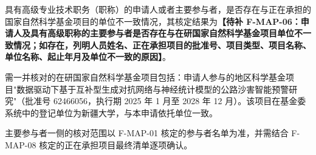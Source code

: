 \justifying
\NSFCBodyText

具有高级专业技术职务（职称）的申请人或者主要参与者，是否存在与正在承担的国家自然科学基金项目的单位不一致情况，其核定结果为\textbf{【待补 F-MAP-06：申请人及具有高级职称的主要参与者是否存在与在研国家自然科学基金项目单位不一致情况；如存在，列明人员姓名、正在承担项目的批准号、项目类型、项目名称、单位名称、起止年月及单位不一致的原因】}。

需一并核对的在研国家自然科学基金项目包括：申请人参与的地区科学基金项目"数据驱动下基于互补型生成对抗网络与神经统计模型的公路沙害智能预警研究"（批准号 62466056，执行期 2025 年 1 月至 2028 年 12 月）。该项目在基金委系统中的登记单位为新疆大学，与本申请依托单位一致。

主要参与者一侧的核对范围以 F-MAP-01 核定的参与者名单为准，并需结合 F-MAP-08 核定的正在承担项目最终清单逐项确认。
